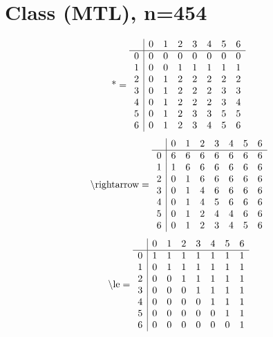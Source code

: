 \documentclass[11pt]{article}
\begin{document}
\section{Class (MTL), n=454}
\[\text{*} = 
\begin{array}{r | r r r r r r r}
 & 0 & 1 & 2 & 3 & 4 & 5 & 6 \\ \hline
0 & 0 & 0 & 0 & 0 & 0 & 0 & 0 \\
1 & 0 & 0 & 1 & 1 & 1 & 1 & 1 \\
2 & 0 & 1 & 2 & 2 & 2 & 2 & 2 \\
3 & 0 & 1 & 2 & 2 & 2 & 3 & 3 \\
4 & 0 & 1 & 2 & 2 & 2 & 3 & 4 \\
5 & 0 & 1 & 2 & 3 & 3 & 5 & 5 \\
6 & 0 & 1 & 2 & 3 & 4 & 5 & 6 \\
\end{array}
\]
\[\text{\textbackslash rightarrow} = 
\begin{array}{r | r r r r r r r}
 & 0 & 1 & 2 & 3 & 4 & 5 & 6 \\ \hline
0 & 6 & 6 & 6 & 6 & 6 & 6 & 6 \\
1 & 1 & 6 & 6 & 6 & 6 & 6 & 6 \\
2 & 0 & 1 & 6 & 6 & 6 & 6 & 6 \\
3 & 0 & 1 & 4 & 6 & 6 & 6 & 6 \\
4 & 0 & 1 & 4 & 5 & 6 & 6 & 6 \\
5 & 0 & 1 & 2 & 4 & 4 & 6 & 6 \\
6 & 0 & 1 & 2 & 3 & 4 & 5 & 6 \\
\end{array}
\]
\[\text{\textbackslash le} = 
\begin{array}{r | r r r r r r r}
 & 0 & 1 & 2 & 3 & 4 & 5 & 6 \\ \hline
0 & 1 & 1 & 1 & 1 & 1 & 1 & 1 \\
1 & 0 & 1 & 1 & 1 & 1 & 1 & 1 \\
2 & 0 & 0 & 1 & 1 & 1 & 1 & 1 \\
3 & 0 & 0 & 0 & 1 & 1 & 1 & 1 \\
4 & 0 & 0 & 0 & 0 & 1 & 1 & 1 \\
5 & 0 & 0 & 0 & 0 & 0 & 1 & 1 \\
6 & 0 & 0 & 0 & 0 & 0 & 0 & 1 \\
\end{array}
\]
\end{document}
